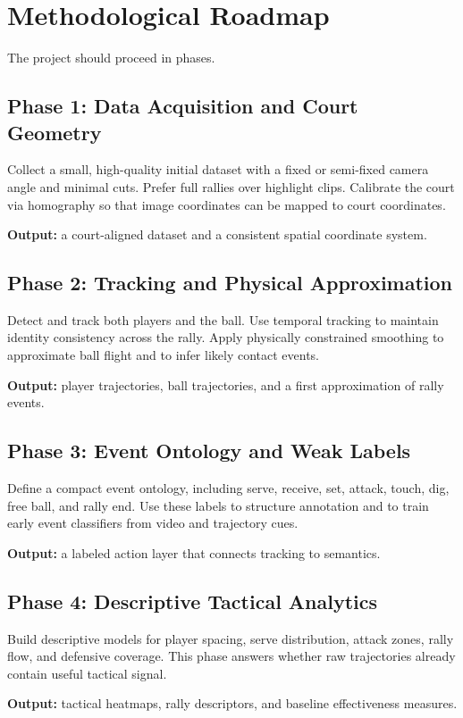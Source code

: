 \documentclass[a4paper]{article}
\begin{document}
\section{Methodological Roadmap}
The project should proceed in phases.

\subsection{Phase 1: Data Acquisition and Court Geometry}
Collect a small, high-quality initial dataset with a fixed or semi-fixed camera angle and minimal cuts. Prefer full rallies over highlight clips. Calibrate the court via homography so that image coordinates can be mapped to court coordinates.

\textbf{Output:} a court-aligned dataset and a consistent spatial coordinate system.

\subsection{Phase 2: Tracking and Physical Approximation}
Detect and track both players and the ball. Use temporal tracking to maintain identity consistency across the rally. Apply physically constrained smoothing to approximate ball flight and to infer likely contact events.

\textbf{Output:} player trajectories, ball trajectories, and a first approximation of rally events.

\subsection{Phase 3: Event Ontology and Weak Labels}
Define a compact event ontology, including serve, receive, set, attack, touch, dig, free ball, and rally end. Use these labels to structure annotation and to train early event classifiers from video and trajectory cues.

\textbf{Output:} a labeled action layer that connects tracking to semantics.

\subsection{Phase 4: Descriptive Tactical Analytics}
Build descriptive models for player spacing, serve distribution, attack zones, rally flow, and defensive coverage. This phase answers whether raw trajectories already contain useful tactical signal.

\textbf{Output:} tactical heatmaps, rally descriptors, and baseline effectiveness measures.
\end{document}
